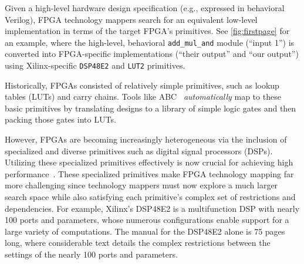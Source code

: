

Given a high-level hardware design specification
  (e.g., expressed in behavioral Verilog),
  FPGA technology mappers
  search for an equivalent
  low-level implementation
  in terms of the target FPGA's
  primitives.
See \cref{fig:firstpage} for an example, where
the high-level, behavioral \texttt{add\_mul\_and}
  module (``input 1'')
  is converted into FPGA-specific implementations
  (``their output'' and ``our output'')
  using Xilinx-specific
  \texttt{DSP48E2} and \texttt{LUT2} primitives.
  
Historically,
  FPGAs consisted of relatively simple
  primitives, such as
  lookup tables (LUTs) and carry chains.
Tools like
  ABC~\cite{ABC,abc2,brayton2010abc}
  \textit{automatically} 
  map to these basic primitives
  by translating designs
  to a library of simple logic gates
  and then packing those gates
  into LUTs.

However, FPGAs are becoming
  increasingly heterogeneous
  via
  the inclusion of specialized and diverse primitives
  such as digital signal processors (DSPs).
Utilizing these specialized primitives
  effectively
  is now
  crucial for achieving
  high performance~\cite{vega2021reticle}.
These specialized primitives
  make FPGA technology mapping far more challenging
  since technology mappers must now
  explore a much larger search space
  while also satisfying each primitive's
  complex set of restrictions and dependencies.
For example, Xilinx's DSP48E2
  is a multifunction 
  DSP
  with nearly
  100 ports and parameters,
  whose numerous configurations
  enable 
  support for a large variety of computations.
The manual for the DSP48E2 alone
  is 75 pages long,
  where considerable text details
  the complex restrictions
  between the settings of the nearly 100
  ports and parameters.

